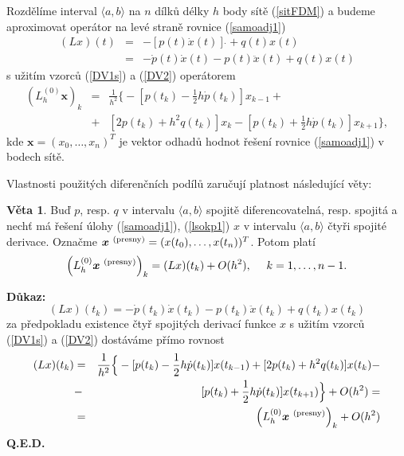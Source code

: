 \documentclass[a4paper, 12pt]{book}
\theoremstyle{definition}
\newtheorem{theorem}{Věta}[section]
\def\vc#1{\mathbf{\boldsymbol{#1}}}     %
\begin{document}
Rozdělíme interval $\langle a,b\rangle$ na $n$ dílků délky $h$ body sítě 
(\ref{sitFDM}) a budeme aproximovat operátor na levé straně rovnice 
(\ref{samoadj1})
\begin{equation}\label{opL}
\begin{array}{rcl}
(L x)(t)&=&-[p(t)\dot x(t)]\,\dot{}+q(t)x(t)\\
&=&-\dot p(t)\dot x(t)-p(t)\ddot x(t)+q(t)x(t)
\end{array}
\end{equation}
s užitím vzorců (\ref{DV1s}) a (\ref{DV2}) operátorem
\begin{equation}\label{opL0}
\begin{array}{rcl}
\left(L_h^{(0)} \vc x\right)_k&=&\frac 1{h^2}\Big\{-[p(t_k)-\frac 12 h\dot p(t_k)]x_{k-1}+\\
&+&[2p(t_k)+h^2q(t_k)]x_k-[p(t_k)+\frac 12 h\dot p(t_k)]x_{k+1}\Big\},
\end{array}
\end{equation}
kde $\vc x=(x_0,\dots,x_n)^T$ je vektor odhadů hodnot řešení rovnice 
(\ref{samoadj1}) v bodech sítě.

Vlastnosti použitých diferenčních podílů zaručují platnost následující věty:
\begin{theorem}\label{FDM-I}
Buď $p$, resp. $q$ v intervalu $\langle a,b\rangle$ spojitě diferencovatelná,
resp. spojitá a nechť má řešení úlohy (\ref{samoadj1}), (\ref{lsokp1}) $x$ 
v intervalu $\langle a,b\rangle$ čtyři spojité derivace. Označme 
$\vc x^{\ \rm(presny)}=(x(t_0),\dots,x(t_n))^T$. Potom platí
\begin{displaymath}
\left(L_h^{(0)} \vc x^{\ \rm(presny)}\right)_k = (Lx)(t_k)+O(h^2), ~~~~ k=1,\dots,n-1.
\end{displaymath}
\end{theorem}
{\bf Důkaz:}\nopagebreak
\begin{displaymath}
(Lx)(t_k) = -\dot p(t_k)\dot x(t_k)-p(t_k)\ddot x(t_k)+q(t_k)x(t_k)
\end{displaymath}
za předpokladu existence čtyř spojitých derivací funkce $x$ s užitím vzorců 
(\ref{DV1s}) a (\ref{DV2}) dostáváme přímo rovnost
\begin{eqnarray*}
(Lx)(t_k) &=& \frac 1{h^2}\Big\{-[p(t_k)-\frac 12 h\dot p(t_k)]x(t_{k-1})+[2p(t_k)+h^2q(t_k)]x(t_k)-\\
&-& [p(t_k)+\frac 12 h\dot p(t_k)]x(t_{k+1})\Big\}+O(h^2)=\\
&=& \left(L_h^{(0)} \vc x^{\ \rm(presny)}\right)_k + O(h^2)
\end{eqnarray*}
{\bf Q.E.D.}
\end{document}
